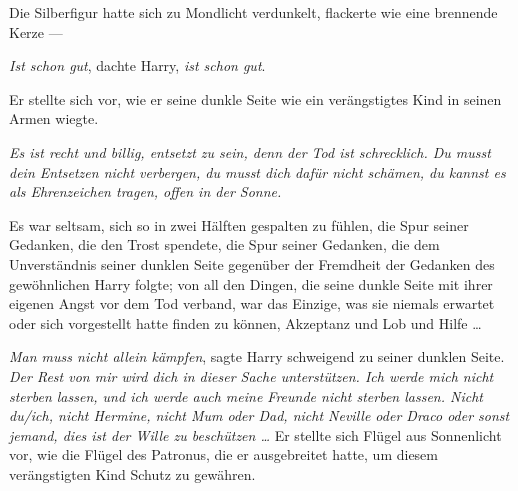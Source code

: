 Die Silberfigur hatte sich zu Mondlicht verdunkelt, flackerte wie eine brennende Kerze —

\emph{Ist schon gut}, dachte Harry, \emph{ist schon gut}.

Er stellte sich vor, wie er seine dunkle Seite wie ein verängstigtes Kind in seinen Armen wiegte.

\emph{Es ist recht und billig, entsetzt zu sein, denn der Tod ist schrecklich. Du musst dein Entsetzen nicht verbergen, du musst dich dafür nicht schämen, du kannst es als Ehrenzeichen tragen, offen in der Sonne.}

Es war seltsam, sich so in zwei Hälften gespalten zu fühlen, die Spur seiner Gedanken, die den Trost spendete, die Spur seiner Gedanken, die dem Unverständnis seiner dunklen Seite gegenüber der Fremdheit der Gedanken des gewöhnlichen Harry folgte; von all den Dingen, die seine dunkle Seite mit ihrer eigenen Angst vor dem Tod verband, war das Einzige, was sie niemals erwartet oder sich vorgestellt hatte finden zu können, Akzeptanz und Lob und Hilfe …

\emph{Man muss nicht allein kämpfen}, sagte Harry schweigend zu seiner dunklen Seite. \emph{Der Rest von mir wird dich in dieser Sache unterstützen. Ich werde mich nicht sterben lassen, und ich werde auch meine Freunde nicht sterben lassen. Nicht du/ich, nicht Hermine, nicht Mum oder Dad, nicht Neville oder Draco oder sonst jemand, dies ist der Wille zu beschützen …} Er stellte sich Flügel aus Sonnenlicht vor, wie die Flügel des Patronus, die er ausgebreitet hatte, um diesem verängstigten Kind Schutz zu gewähren.

